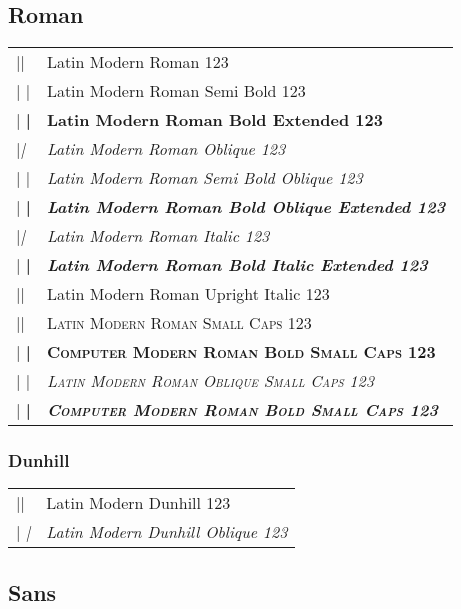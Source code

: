 \documentclass{article}
\makeatletter
\newenvironment{vrb}{\begin{tabular}{@{}p{5cm}l@{}}}{\end{tabular}}
\makeatother
\begin{document}
\subsection*{Roman}

\rmfamily
\begin{vrb}
|\rmfamily| & {Latin Modern Roman 123} \\
|  \sbweight| & {\sbweight Latin Modern Roman Semi Bold 123} \\
|  \bfseries| & {\bfseries Latin Modern Roman Bold Extended 123} \\
|\slshape| & {\slshape Latin Modern Roman Oblique 123} \\
|  \sbweight| & {\sbweight\slshape Latin Modern Roman Semi Bold Oblique 123} \\
|  \bfseries| & {\bfseries\slshape Latin Modern Roman Bold Oblique Extended 123} \\
|\itshape| & {\itshape Latin Modern Roman Italic 123} \\
|  \bfseries| & {\bfseries\itshape Latin Modern Roman Bold Italic Extended 123} \\
|\uishape| & {\uishape Latin Modern Roman Upright Italic 123} \\
|\scshape| & {\scshape Latin Modern Roman Small Caps 123} \\
|  \bfseries| & {\bfseries\scshape Computer Modern Roman Bold Small Caps 123} \\
|  \sishape| & {\scshape\slshape Latin Modern Roman Oblique Small Caps 123} \\
|    \bfseries| & {\slshape\bfseries\scshape Computer Modern Roman Bold Small Caps 123} \\
\end{vrb}

\subsubsection*{Dunhill}

\tistyle
\begin{vrb}
|\tistyle | & {Latin Modern Dunhill 123} \\
|  \slshape| & {\slshape Latin Modern Dunhill Oblique 123} \\
\end{vrb}

\subsection*{Sans}
\end{document}
